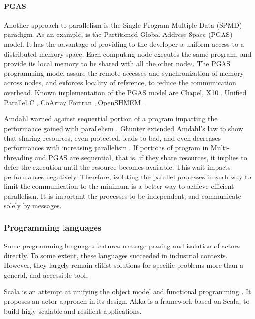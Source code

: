 \paragraph{PGAS}

Another approach to parallelism is the Single Program Multiple Data (SPMD) paradigm.
As an example, is the Partitioned Global Address Space (PGAS) model.
It has the advantage of providing to the developer a uniform access to a distributed memory space.
Each computing node executes the same program, and provide its local memory to be shared with all the other nodes.
The PGAS programming model assure the remote accesses and synchronization of memory across nodes, and enforces locality of reference, to reduce the communication overhead.
Known implementation of the PGAS model are 
Chapel\cite{Chamberlain2007},
X10 \cite{Charles2005}.
Unified Parallel C \cite{El-Ghazawi2006},
CoArray Fortran \cite{Numrich1998},
OpenSHMEM \cite{Chapman2010}.

Amdahl warned against sequential portion of a program impacting the performance gained with parallelism \cite{Amdahl1967}.
Ghunter extended Amdahl's law to show that sharing resources, even protected, leads to bad, and even decreases performances with increasing parallelism \cite{Gustafson1988,Gunther1993,Gunther1996,Nelson1996,Gunther2002}.
If portions of program in Multi-threading and PGAS are sequential, that is, if they share resources, it implies to defer the execution until the resource becomes available.
This wait impacts performances negatively.
Therefore, isolating the parallel processes in such way to limit the communication to the minimum is a better way to achieve efficient parallelism.
It is important the processes to be independent, and communicate solely by messages.


\subsubsection{Programming languages}


Some programming languages features message-passing and isolation of actors directly.
To some extent, these languages succeeded in industrial contexts.
However, they largely remain elitist solutions for specific problems more than a general, and accessible tool.

Scala is an attempt at unifying the object model and functional programming \cite{Odersky2004}.
It proposes an actor approach in its design.
Akka is a framework based on Scala, to build higly scalable and resilient applications.

